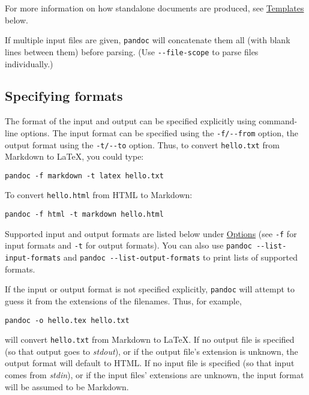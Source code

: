 \documentclass[
  12pt,
  a4paper,
]{article}
\begin{document}
For more information on how standalone documents are produced, see
\protect\hyperlink{templates}{Templates} below.

If multiple input files are given, \texttt{pandoc} will concatenate them all (with blank lines
between them) before parsing. (Use \texttt{-\/-file-scope} to parse files individually.)

\hypertarget{specifying-formats}{%
\subsection{Specifying formats}\label{specifying-formats}}

The format of the input and output can be specified explicitly using command-line options. The
input format can be specified using the \texttt{-f/-\/-from} option, the output format using the
\texttt{-t/-\/-to} option. Thus, to convert \texttt{hello.txt} from Markdown to LaTeX, you could
type:

\begin{verbatim}
pandoc -f markdown -t latex hello.txt
\end{verbatim}

To convert \texttt{hello.html} from HTML to Markdown:

\begin{verbatim}
pandoc -f html -t markdown hello.html
\end{verbatim}

Supported input and output formats are listed below under \protect\hyperlink{options}{Options}
(see \texttt{-f} for input formats and \texttt{-t} for output formats). You can also use
\texttt{pandoc\ -\/-list-input-formats} and \texttt{pandoc\ -\/-list-output-formats} to print
lists of supported formats.

If the input or output format is not specified explicitly, \texttt{pandoc} will attempt to guess
it from the extensions of the filenames. Thus, for example,

\begin{verbatim}
pandoc -o hello.tex hello.txt
\end{verbatim}

will convert \texttt{hello.txt} from Markdown to LaTeX. If no output file is specified (so that
output goes to \emph{stdout}), or if the output file's extension is unknown, the output format
will default to HTML. If no input file is specified (so that input comes from \emph{stdin}), or if
the input files' extensions are unknown, the input format will be assumed to be Markdown.
\end{document}
